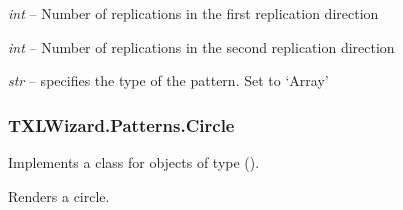 \documentclass[letterpaper,10pt,english]{sphinxmanual}
\begin{document}
\begin{fulllineitems}
\begin{fulllineitems}
\label{Chapters/PythonModuleReference/Patterns/TXLWizard.Patterns.Array:TXLWizard.Patterns.Array.Array.Repetitions1}
\emph{int} -- Number of replications in the first replication direction

\end{fulllineitems}


\begin{fulllineitems}
\label{Chapters/PythonModuleReference/Patterns/TXLWizard.Patterns.Array:TXLWizard.Patterns.Array.Array.Repetitions2}
\emph{int} -- Number of replications in the second replication direction

\end{fulllineitems}


\begin{fulllineitems}
\label{Chapters/PythonModuleReference/Patterns/TXLWizard.Patterns.Array:TXLWizard.Patterns.Array.Array.Type}
\emph{str} -- specifies the type of the pattern. Set to `Array'

\end{fulllineitems}


\end{fulllineitems}



\subsubsection{TXLWizard.Patterns.Circle}
\label{Chapters/PythonModuleReference/Patterns/TXLWizard.Patterns.Circle:module-TXLWizard.Patterns.Circle}\label{Chapters/PythonModuleReference/Patterns/TXLWizard.Patterns.Circle::doc}\label{Chapters/PythonModuleReference/Patterns/TXLWizard.Patterns.Circle:txlwizard-patterns-circle}
Implements a class for  objects of type  ().

Renders a circle.
\end{document}
